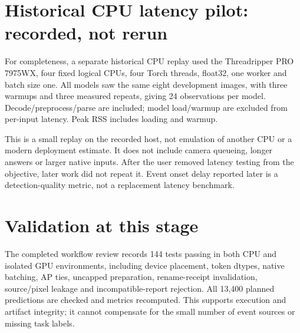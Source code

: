 \section{Historical CPU latency pilot: recorded, not rerun}
For completeness, a separate historical CPU replay used the Threadripper PRO 7975WX, four fixed logical CPUs, four Torch threads, float32, one worker and batch size one. All models saw the same eight development images, with three warmups and three measured repeats, giving 24 observations per model. Decode/preprocess/parse are included; model load/warmup are excluded from per-input latency. Peak RSS includes loading and warmup.

This is a small replay on the recorded host, not emulation of another CPU or a modern deployment estimate. It does not include camera queueing, longer answers or larger native inputs. After the user removed latency testing from the objective, later work did not repeat it. Event onset delay reported later is a detection-quality metric, not a replacement latency benchmark.

\section{Validation at this stage}
The completed workflow review records 144 tests passing in both CPU and isolated GPU environments, including device placement, token dtypes, native batching, AP ties, uncapped preparation, rename-receipt invalidation, source/pixel leakage and incompatible-report rejection. All 13,400 planned predictions are checked and metrics recomputed. This supports execution and artifact integrity; it cannot compensate for the small number of event sources or missing task labels.
